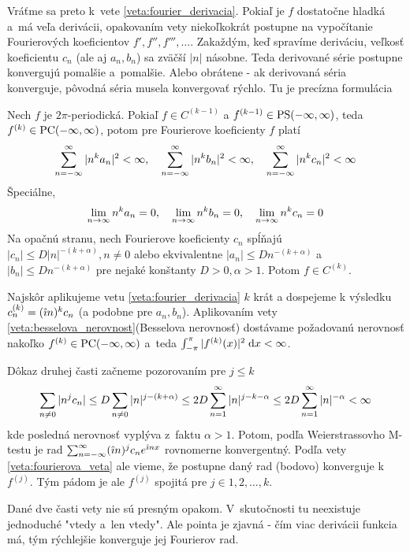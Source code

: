 Vráťme sa preto k~vete \ref{veta:fourier_derivacia}. Pokiaľ
je $f$ dostatočne hladká a~má veľa derivácii, opakovaním vety
niekoľkokrát postupne na vypočítanie Fourierových koeficientov
$f',f'',f''',\dots$. Zakaždým, keď spravíme deriváciu, veľkosť
koeficientu $c_n$ (ale aj $a_n,b_n$) sa zväčší $|n|$ násobne. Teda
derivované série postupne konvergujú pomalšie a~pomalšie. Alebo obrátene - 
ak derivovaná séria konverguje, pôvodná séria musela konvergovať
rýchlo. Tu je precízna formulácia
\begin{veta}
    Nech $f$ je $2\pi$-periodická. Pokiaľ
    $f\in C^{(k-1)}$ a $f^{(k-1)} \in \mbox{PS}(-\infty,\infty)$, teda $f^{(k)} \in
    \mbox{PC}(-\infty,\infty)$, potom pre Fourierove koeficienty $f$ platí
    \begin{equation}
        \sum_{n=-\infty}^{\infty} |n^k a_n|^2 < \infty, \quad
        \sum_{n=-\infty}^{\infty} |n^k b_n|^2 < \infty, \quad
        \sum_{n=-\infty}^{\infty} |n^k c_n|^2 < \infty
    \end{equation}
    Špeciálne,
    \begin{equation}
        \lim_{n \rightarrow \infty} n^k a_n =0, \quad
        \lim_{n \rightarrow \infty} n^k b_n =0, \quad
        \lim_{n \rightarrow \infty} n^k c_n =0
    \end{equation}
    Na opačnú stranu, nech Fourierove koeficienty $c_n$ spĺňajú
    $|c_n| \le D |n|^{-(k+\alpha)}, n\not=0$ alebo ekvivalentne
    $|a_n| \le D n^{-(k+\alpha)}$ a 
    $|b_n| \le D n^{-(k+\alpha)}$ pre nejaké konštanty 
    $D>0, \alpha>1$. Potom $f \in C^{(k)}$.
\end{veta}
\begin{dokaz}
    Najskôr aplikujeme vetu  \ref{veta:fourier_derivacia}
    $k$ krát a dospejeme k výsledku
    $c_n^{(k)} = (\hat{\imath} n)^k c_n$ (a podobne pre $a_n,b_n$).
    Aplikovaním vety \ref{veta:besselova_nerovnost}(Besselova
    nerovnosť)
    dostávame požadovanú nerovnosť nakoľko $f^{(k)} \in
    \mbox{PC}(-\infty,\infty)$ a~teda $\int_{-\pi}^{\pi} |f^{(k)}(x)|^2 \; \mathrm{d} x < \infty$.

    Dôkaz druhej časti začneme pozorovaním pre $j\le k$
    \begin{equation}
        \sum_{n\not=0} |n^j c_n| \le 
        D \sum_{n\not=0} |n|^{j - (k+\alpha)} \le
        2D \sum_{n=1}^{\infty} |n|^{j-k-\alpha} \le
        2D \sum_{n=1}^{\infty} |n|^{-\alpha} < \infty
    \end{equation}
    kde posledná nerovnosť vyplýva z~faktu $\alpha>1$.
    Potom, podľa Weierstrassovho M-testu je rad
    $\sum_{n=-\infty}^{\infty} (\hat{\imath} n)^j c_n e^{\hat{\imath} n x}$ rovnomerne
    konvergentný. Podľa vety \ref{veta:fourierova_veta} ale vieme, že
    postupne daný rad (bodovo) konverguje k $f^{(j)}$. Tým pádom je ale 
    $f^{(j)}$ spojitá pre $j\in 1,2,\dots,k$.
\end{dokaz}

Dané dve časti vety nie sú presným opakom. V~skutočnosti tu neexistuje
jednoduché "vtedy a~len vtedy". Ale pointa je zjavná - čím viac
derivácii funkcia má, tým rýchlejšie konverguje jej Fourierov rad.

